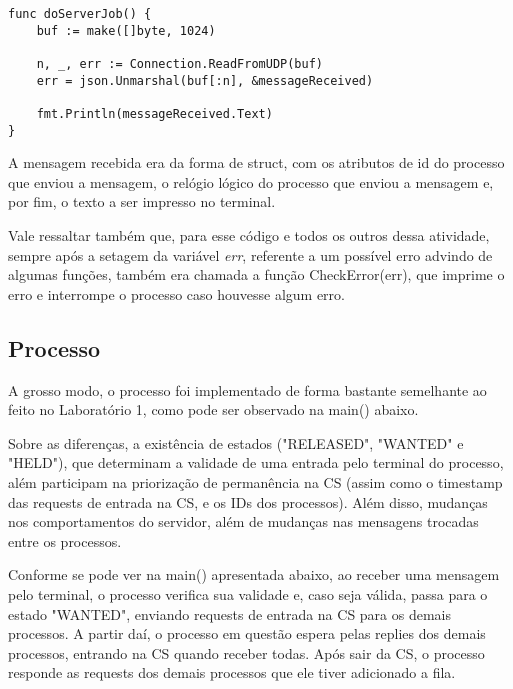 \documentclass[conference]{IEEEtran}
\begin{document}
\begin{lstlisting}
func doServerJob() {
	buf := make([]byte, 1024)

	n, _, err := Connection.ReadFromUDP(buf)
	err = json.Unmarshal(buf[:n], &messageReceived)

	fmt.Println(messageReceived.Text)
}
\end{lstlisting}

	A mensagem recebida era da forma de struct, com os atributos de id do processo que enviou a mensagem, o relógio lógico do processo que enviou a mensagem e, por fim, o texto a ser impresso no terminal.

	Vale ressaltar também que, para esse código e todos os outros dessa atividade, sempre após a setagem da variável \textit{err}, referente a um possível erro advindo de algumas funções, também era chamada a função CheckError(err), que imprime o erro e interrompe o processo caso houvesse algum erro.
	
\subsection{Processo}

	A grosso modo, o processo foi implementado de forma bastante semelhante ao feito no Laboratório 1, como pode ser observado na main() abaixo. 
	
	Sobre as diferenças, a existência de estados ("RELEASED", "WANTED" e "HELD"), que determinam a validade de uma entrada pelo terminal do processo, além participam na priorização de permanência na CS (assim como o timestamp das requests de entrada na CS, e os IDs dos processos). Além disso, mudanças nos comportamentos do servidor, além de mudanças nas mensagens trocadas entre os processos.
	
	Conforme se pode ver na main() apresentada abaixo, ao receber uma mensagem pelo terminal, o processo verifica sua validade e, caso seja válida, passa para o estado "WANTED", enviando requests de entrada na CS para os demais processos. A partir daí, o processo em questão espera pelas replies dos demais processos, entrando na CS quando receber todas. Após sair da CS, o processo responde as requests dos demais processos que ele tiver adicionado a fila.
	
\end{document}
